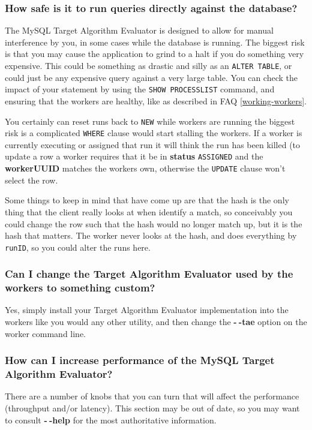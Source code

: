 \documentclass[11pt,letterpaper,oneside]{article}
\begin{document}
\subsubsection{How safe is it to run queries directly against the database?}

The MySQL Target Algorithm Evaluator is designed to allow for manual interference by you, in some cases while the database is running. The biggest risk is that you may cause the application to grind to a halt if you do something very expensive. This could be something as drastic and silly as an \texttt{ALTER TABLE}, or could just be any expensive query against a very large table. You can check the impact of your statement by using the \texttt{SHOW PROCESSLIST} command, and ensuring that the workers are healthy, like as described in FAQ \ref{working-workers}. 

You certainly can reset runs back to \texttt{NEW} while workers are running the biggest risk is a complicated \texttt{WHERE} clause would start stalling the workers. If a worker is currently executing or assigned that run it will think the run has been killed (to update a row a worker requires that it be in \textbf{status} \texttt{ASSIGNED} and the \textbf{workerUUID} matches the workers own, otherwise the \texttt{UPDATE} clause won't select the row.

Some things to keep in mind that have come up are that the hash is the only thing that the client really looks at when identify a match, so conceivably you could change the row such that the hash would no longer match up, but it is the hash that matters. The worker never looks at the hash, and does everything by \texttt{runID}, so you could alter the runs here.


\subsubsection{Can I change the Target Algorithm Evaluator used by the workers to something custom?}

Yes, simply install your Target Algorithm Evaluator implementation into the workers like you would any other utility, and then change the \textbf{-$~\!$-tae} option on the worker command line.

\subsubsection{How can I increase performance of the MySQL Target Algorithm Evaluator?}
\label{faq:performance}
There are a number of knobs that you can turn that will affect the performance (throughput and/or latency). This section may be out of date, so you may want to consult \textbf{-$~\!$-help} for the most authoritative information.
\end{document}
